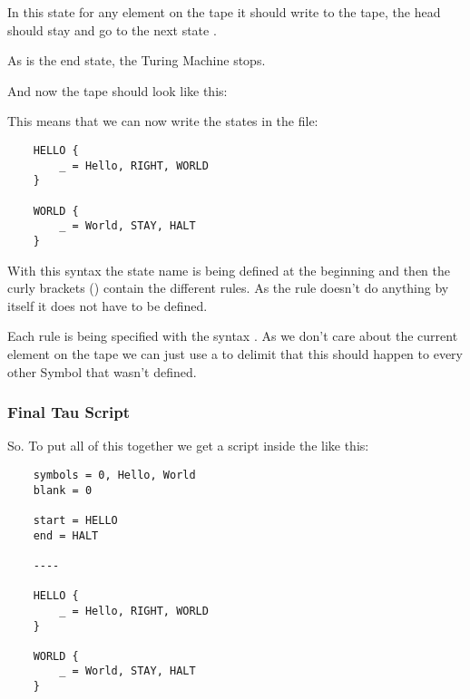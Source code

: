 In this state for any element on the tape it should write  to the tape, the head should stay and go to the next state .

As  is the end state, the Turing Machine stops.

\vspace{0.8em}

And now the tape should look like this:
\begin{center}
\end{center}

This means that we can now write the states in the  file:
\begin{verbatim}
    HELLO {
        _ = Hello, RIGHT, WORLD
    }

    WORLD {
        _ = World, STAY, HALT
    }
\end{verbatim}

With this syntax the state name is being defined at the beginning and then the curly brackets (\code{\{\}}) contain the different rules. 
As the  rule doesn't do anything by itself it does not have to be defined.

Each rule is being specified with the syntax . 
As we don't care about the current element on the tape we can just use a \code{\_} to delimit that this should happen to every other Symbol that wasn't defined.

\subsubsection{Final Tau Script}
So. To put all of this together we get a script inside the  like this:

\begin{verbatim}
    symbols = 0, Hello, World
    blank = 0
    
    start = HELLO
    end = HALT

    ----

    HELLO {
        _ = Hello, RIGHT, WORLD
    }

    WORLD {
        _ = World, STAY, HALT
    }
\end{verbatim}

